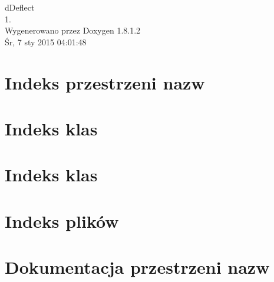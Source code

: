 \documentclass{book}
\begin{document}
\hypersetup{pageanchor=false,citecolor=blue}
\begin{titlepage}
\vspace*{7cm}
\begin{center}
{\Large d\-Deflect \\[1ex]\large 1. }\\
\vspace*{1cm}
{\large Wygenerowano przez Doxygen 1.8.1.2}\\
\vspace*{0.5cm}
{\small Śr, 7 sty 2015 04:01:48}\\
\end{center}
\end{titlepage}
\clearemptydoublepage
{}
\tableofcontents
\clearemptydoublepage
{}
\hypersetup{pageanchor=true,citecolor=blue}
\chapter{Indeks przestrzeni nazw}

\chapter{Indeks klas}

\chapter{Indeks klas}

\chapter{Indeks plików}

\chapter{Dokumentacja przestrzeni nazw}

\end{document}

